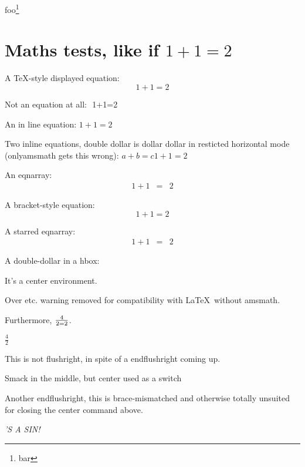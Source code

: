 \documentclass{article}
\begin{document}
\begin{figure}
\end{figure}

\begin{minipage}{5cm}
  foo\footnote{bar}
\end{minipage}

\section{Maths tests, like if $1+1=2$}


A \TeX-style displayed equation:
$$ 1+1=2 $$

Not an equation at all:
$ $ 1+1=2 $ $

An in line equation:
$1+1=2$

Two inline equations, double dollar is dollar dollar in resticted
horizontal mode (onlyamsmath gets this wrong):
$a+b=c$$1+1=2$

An eqnarray:
\begin{eqnarray}
1+1 &=& 2
\end{eqnarray}

A bracket-style equation:
\[1+1=2\]

A starred eqnarray:
\begin{eqnarray*}
1+1 &=& 2
\end{eqnarray*}

A double-dollar in a hbox:
\hbox{$$}

\begin{appendix}
  \begin{center}
    It's a center environment.
  \end{center}
  Over etc. warning removed for compatibility with \LaTeX\ without amsmath.

  \centerline{Furthermore, $4\over 2=2$.}
  $\frac 42$
\end{appendix}
This is not flushright, in spite of a endflushright coming up.
\endflushright
{}
{\center Smack in the middle, but center used as a switch\par}

Another endflushright, this is brace-mismatched and otherwise totally
unsuited for closing the center command above.
\endflushright

\MakeUppercase{\it's a sin!}

\listoffigures
{}
\end{document}
